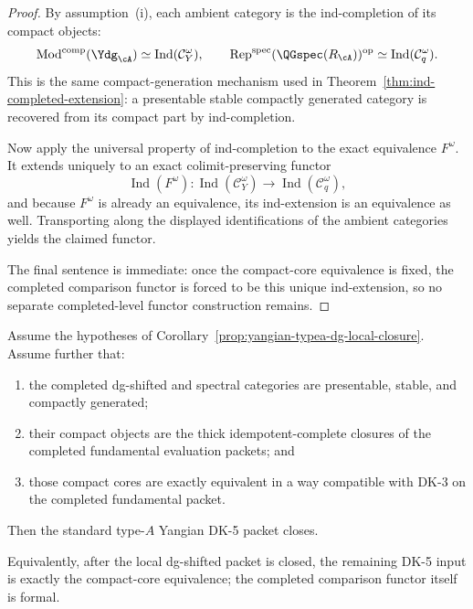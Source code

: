 \begin{proof}
By assumption~\textup{(i)}, each ambient category is the
ind-completion of its compact objects:
\[
\operatorname{Mod}^{\mathrm{comp}}(\Ydg_{\cA})
\simeq
\operatorname{Ind}(\mathcal{C}_Y^\omega),
\qquad
\operatorname{Rep}^{\mathrm{spec}}(\QGspec(R_{\cA}))^{\mathrm{op}}
\simeq
\operatorname{Ind}(\mathcal{C}_q^\omega).
\]
This is the same compact-generation mechanism used in
Theorem~\ref{thm:ind-completed-extension}: a presentable stable
compactly generated category is recovered from its compact part by
ind-completion.

Now apply the universal property of ind-completion to the exact
equivalence $F^\omega$. It extends uniquely to an exact
colimit-preserving functor
\[
\operatorname{Ind}(F^\omega)\colon
\operatorname{Ind}(\mathcal{C}_Y^\omega)
\longrightarrow
\operatorname{Ind}(\mathcal{C}_q^\omega),
\]
and because $F^\omega$ is already an equivalence, its ind-extension is
an equivalence as well. Transporting along the displayed
identifications of the ambient categories yields the claimed functor.

The final sentence is immediate: once the compact-core equivalence is
fixed, the completed comparison functor is forced to be this unique
ind-extension, so no separate completed-level functor construction
remains.
\end{proof}

\begin{corollary}
\label{cor:yangian-dk5-compact-core}
Assume the hypotheses of
Corollary~\ref{prop:yangian-typea-dg-local-closure}. Assume further
that:
\begin{enumerate}[label=\textup{(\roman*)}]
\item the completed dg-shifted and spectral categories are presentable,
 stable, and compactly generated;
\item their compact objects are the thick idempotent-complete closures
 of the completed fundamental evaluation packets; and
\item those compact cores are exactly equivalent in a way compatible
 with DK-3 on the completed fundamental packet.
\end{enumerate}
Then the standard type-$A$ Yangian DK-5 packet closes.

Equivalently, after the local dg-shifted packet is closed, the
remaining DK-5 input is exactly the compact-core equivalence; the
completed comparison functor itself is formal.
\end{corollary}

